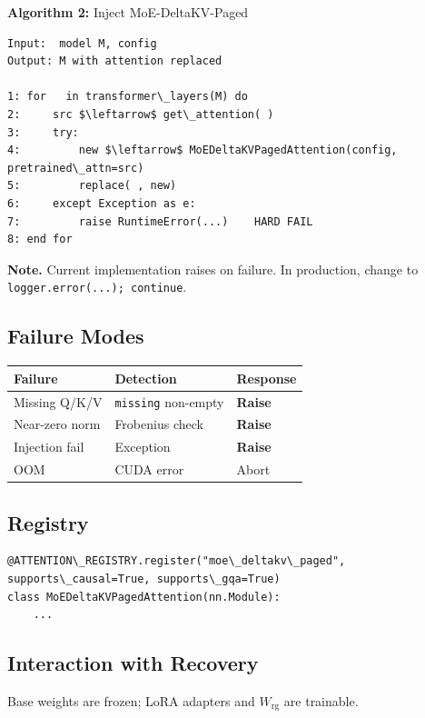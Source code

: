 \textbf{Algorithm 2:} Inject MoE-DeltaKV-Paged
\begin{lstlisting}
Input:  model M, config
Output: M with attention replaced

1: for   in transformer\_layers(M) do
2:     src $\leftarrow$ get\_attention( )
3:     try:
4:         new $\leftarrow$ MoEDeltaKVPagedAttention(config, pretrained\_attn=src)
5:         replace( , new)
6:     except Exception as e:
7:         raise RuntimeError(...)    HARD FAIL
8: end for
\end{lstlisting}

\textbf{Note.} Current implementation raises on failure. In production, change 
to \texttt{logger.error(...); continue}.

\subsection{Failure Modes}

\begin{table}[H]
\centering
\small
\begin{tabular}{lll}
\toprule
\textbf{Failure} & \textbf{Detection} & \textbf{Response} \\
\midrule
Missing Q/K/V & \texttt{missing} non-empty & \textbf{Raise} \\
Near-zero norm & Frobenius check & \textbf{Raise} \\
Injection fail & Exception & \textbf{Raise} \\
OOM & CUDA error & Abort \\
\bottomrule
\end{tabular}
\end{table}

\subsection{Registry}

\begin{lstlisting}
@ATTENTION\_REGISTRY.register("moe\_deltakv\_paged", supports\_causal=True, supports\_gqa=True)
class MoEDeltaKVPagedAttention(nn.Module):
    ...
\end{lstlisting}

\subsection{Interaction with Recovery}

Base weights are frozen; LoRA adapters and $W_\text{rg}$ are trainable.

